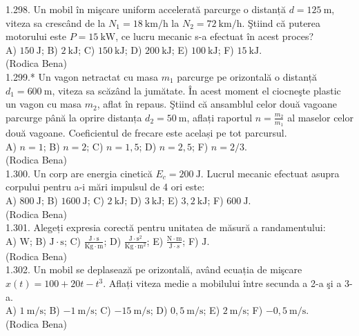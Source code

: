 {1.298. Un mobil în mişcare uniform accelerată parcurge o distanță $d=125 \mathrm{~m}$, viteza sa crescând de la $N_{1}=18 \mathrm{~km} / \mathrm{h}$ la $N_{2}=72 \mathrm{~km} / \mathrm{h}$. Ştiind că puterea motorului este $P=15 \mathrm{~kW}$, ce lucru mecanic s-a efectuat în acest proces?\\ A) $150 \mathrm{~J}$; B) $2 \mathrm{~kJ}$; C) $150 \mathrm{~kJ}$; D) $200 \mathrm{~kJ}$; E) $100 \mathrm{~kJ}$; F) $15 \mathrm{~kJ}$.\\ (Rodica Bena)\\

1.299.* Un vagon netractat cu masa $m_{1}$ parcurge pe orizontală o distanță $d_{1}=600 \mathrm{~m}$, viteza sa scăzând la jumătate. În acest moment el ciocneşte plastic un vagon cu masa $m_{2}$, aflat în repaus. Ştiind că ansamblul celor două vagoane parcurge până la oprire distanța $d_{2}=50 \mathrm{~m}$, aflați raportul $n=\frac{m_{2}}{m_{1}}$ al maselor celor două vagoane. Coeficientul de frecare este același pe tot parcursul.\\ A) $n=1$; B) $n=2$; C) $n=1,5$; D) $n=2,5$; F) $n=2 / 3$.\\ (Rodica Bena)\\

1.300. Un corp are energia cinetică $E_{c}=200 \mathrm{~J}$. Lucrul mecanic efectuat asupra corpului pentru a-i mări impulsul de 4 ori este:\\ A) $800 \mathrm{~J}$; B) $1600 \mathrm{~J}$; C) $2 \mathrm{~kJ}$; D) $3 \mathrm{~kJ}$; E) $3,2 \mathrm{~kJ}$; F) $600 \mathrm{~J}$.\\ (Rodica Bena)\\

1.301. Alegeți expresia corectă pentru unitatea de măsură a randamentului:\\ A) $\mathrm{W}$; B) $\mathrm{J} \cdot \mathrm{s}$; C) $\frac{\mathrm{J} \cdot \mathrm{s}}{\mathrm{Kg} \cdot \mathrm{m}}$; D) $\frac{\mathrm{J} \cdot \mathrm{s}^{2}}{\mathrm{Kg} \cdot \mathrm{m}^{2}}$; E) $\frac{\mathrm{N} \cdot \mathrm{m}}{\mathrm{J} \cdot s}$; F) $\mathrm{J}$.\\ (Rodica Bena)\\

1.302. Un mobil se deplasează pe orizontală, având ecuația de mişcare $x(t)=100+20 t-t^{3}$. Aflați viteza medie a mobilului între secunda a 2-a şi a 3-a.\\ A) $1 \mathrm{~m} / \mathrm{s}$; B) $-1 \mathrm{~m} / \mathrm{s}$; C) $-15 \mathrm{~m} / \mathrm{s}$; D) $0,5 \mathrm{~m} / \mathrm{s}$; E) $2 \mathrm{~m} / \mathrm{s}$; F) $-0,5 \mathrm{~m} / \mathrm{s}$.\\ (Rodica Bena)\\

}
